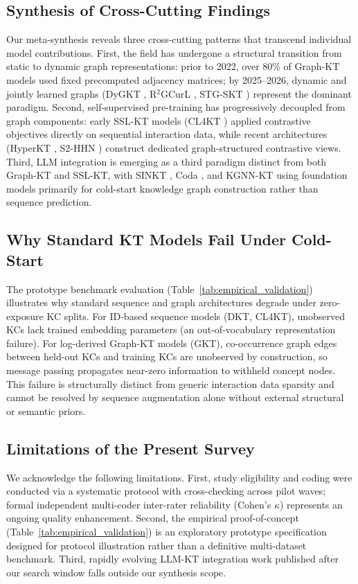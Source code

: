 \documentclass[10pt,journal,compsoc]{IEEEtran}
\begin{document}
\subsection{Synthesis of Cross-Cutting Findings}
Our meta-synthesis reveals three cross-cutting patterns that transcend individual model contributions. First, the field has undergone a structural transition from static to dynamic graph representations: prior to 2022, over 80\% of Graph-KT models used fixed precomputed adjacency matrices; by 2025--2026, dynamic and jointly learned graphs (DyGKT \cite{KT038_DyGKT_2024}, R$^2$GCurL \cite{KT077_R2GCurL_2026}, STG-SKT \cite{KT079_STGSKT_2026}) represent the dominant paradigm. Second, self-supervised pre-training has progressively decoupled from graph components: early SSL-KT models (CL4KT \cite{KT039_CL4KT_2022}) applied contrastive objectives directly on sequential interaction data, while recent architectures (HyperKT \cite{KT066_HyperKT_2025}, S2-HHN \cite{KT042_S2HHN_2023}) construct dedicated graph-structured contrastive views. Third, LLM integration is emerging as a third paradigm distinct from both Graph-KT and SSL-KT, with SINKT \cite{KT044_SINKT_2024}, Coda \cite{KT070_Coda_2025}, and KGNN-KT \cite{KT076_KGNNKT_2025} using foundation models primarily for cold-start knowledge graph construction rather than sequence prediction.

\subsection{Why Standard KT Models Fail Under Cold-Start}
The prototype benchmark evaluation (Table~\ref{tab:empirical_validation}) illustrates why standard sequence and graph architectures degrade under zero-exposure KC splits. For ID-based sequence models (DKT, CL4KT), unobserved KCs lack trained embedding parameters (an out-of-vocabulary representation failure). For log-derived Graph-KT models (GKT), co-occurrence graph edges between held-out KCs and training KCs are unobserved by construction, so message passing propagates near-zero information to withheld concept nodes. This failure is structurally distinct from generic interaction data sparsity and cannot be resolved by sequence augmentation alone without external structural or semantic priors.

\subsection{Limitations of the Present Survey}
We acknowledge the following limitations. First, study eligibility and coding were conducted via a systematic protocol with cross-checking across pilot waves; formal independent multi-coder inter-rater reliability (Cohen's $\kappa$) represents an ongoing quality enhancement. Second, the empirical proof-of-concept (Table~\ref{tab:empirical_validation}) is an exploratory prototype specification designed for protocol illustration rather than a definitive multi-dataset benchmark. Third, rapidly evolving LLM-KT integration work published after our search window falls outside our synthesis scope.
\end{document}
